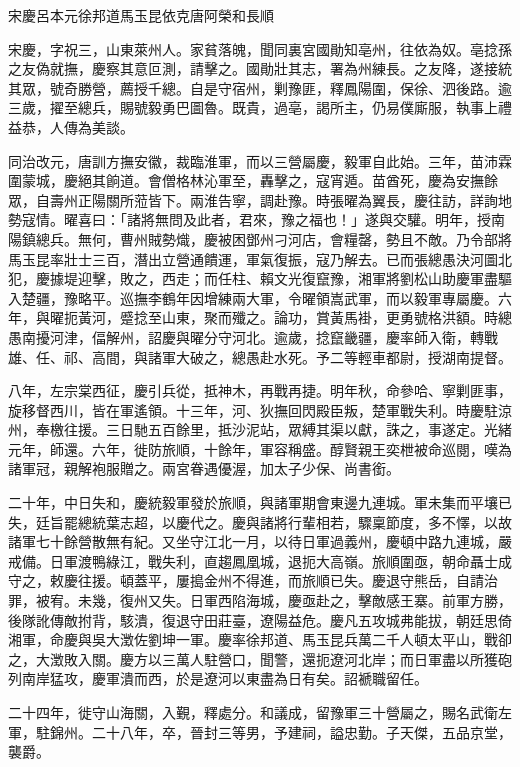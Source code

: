 
\begin{pinyinscope}
宋慶呂本元徐邦道馬玉昆依克唐阿榮和長順

宋慶，字祝三，山東萊州人。家貧落魄，聞同裏宮國勛知亳州，往依為奴。亳捻孫之友偽就撫，慶察其意叵測，請擊之。國勛壯其志，署為州練長。之友降，遂接統其眾，號奇勝營，薦授千總。自是守宿州，剿豫匪，釋鳳陽圍，保徐、泗後路。逾三歲，擢至總兵，賜號毅勇巴圖魯。既貴，過亳，謁所主，仍易僕廝服，執事上禮益恭，人傳為美談。

同治改元，唐訓方撫安徽，裁臨淮軍，而以三營屬慶，毅軍自此始。三年，苗沛霖圍蒙城，慶絕其餉道。會僧格林沁軍至，轟擊之，寇宵遁。苗酋死，慶為安撫餘眾，自壽州正陽關所蒞皆下。兩淮告寧，調赴豫。時張曜為翼長，慶往訪，詳詢地勢寇情。曜喜曰：「諸將無問及此者，君來，豫之福也！」遂與交驩。明年，授南陽鎮總兵。無何，曹州賊勢熾，慶被困鄧州刁河店，會糧罄，勢且不敵。乃令部將馬玉昆率壯士三百，潛出立營通饋運，軍氣復振，寇乃解去。已而張總愚決河圖北犯，慶據堤迎擊，敗之，西走；而任柱、賴文光復竄豫，湘軍將劉松山助慶軍盡驅入楚疆，豫略平。巡撫李鶴年因增練兩大軍，令曜領嵩武軍，而以毅軍專屬慶。六年，與曜扼黃河，蹙捻至山東，聚而殲之。論功，賞黃馬褂，更勇號格洪額。時總愚南擾河津，偪解州，詔慶與曜分守河北。逾歲，捻竄畿疆，慶率師入衛，轉戰雄、任、祁、高間，與諸軍大破之，總愚赴水死。予二等輕車都尉，授湖南提督。

八年，左宗棠西征，慶引兵從，抵神木，再戰再捷。明年秋，命參哈、寧剿匪事，旋移督西川，皆在軍遙領。十三年，河、狄撫回閃殿臣叛，楚軍戰失利。時慶駐涼州，奉檄往援。三日馳五百餘里，抵沙泥站，眾縛其渠以獻，誅之，事遂定。光緒元年，師還。六年，徙防旅順，十餘年，軍容稱盛。醇賢親王奕枻被命巡閱，嘆為諸軍冠，親解袍服贈之。兩宮眷遇優渥，加太子少保、尚書銜。

二十年，中日失和，慶統毅軍發於旅順，與諸軍期會東邊九連城。軍未集而平壤已失，廷旨罷總統葉志超，以慶代之。慶與諸將行輩相若，驟稟節度，多不懌，以故諸軍七十餘營散無有紀。又坐守江北一月，以待日軍過義州，慶頓中路九連城，嚴戒備。日軍渡鴨綠江，戰失利，直趨鳳凰城，退扼大高嶺。旅順圍亟，朝命聶士成守之，敕慶往援。頓蓋平，屢搗金州不得進，而旅順已失。慶退守熊岳，自請治罪，被宥。未幾，復州又失。日軍西陷海城，慶亟赴之，擊敵感王寨。前軍方勝，後隊訛傳敵拊背，駭潰，復退守田莊臺，遼陽益危。慶凡五攻城弗能拔，朝廷思倚湘軍，命慶與吳大澂佐劉坤一軍。慶率徐邦道、馬玉昆兵萬二千人頓太平山，戰卻之，大澂敗入關。慶方以三萬人駐營口，聞警，還扼遼河北岸；而日軍盡以所獲砲列南岸猛攻，慶軍潰而西，於是遼河以東盡為日有矣。詔褫職留任。

二十四年，徙守山海關，入覲，釋處分。和議成，留豫軍三十營屬之，賜名武衛左軍，駐錦州。二十八年，卒，晉封三等男，予建祠，謚忠勤。子天傑，五品京堂，襲爵。


\end{pinyinscope}
